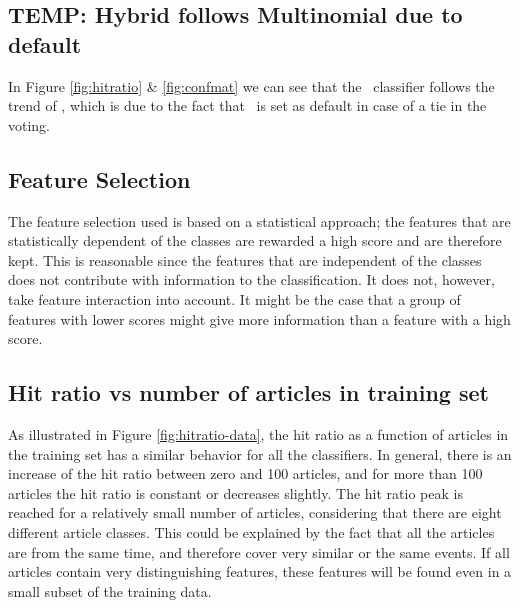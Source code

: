 \subsection{TEMP: Hybrid follows Multinomial due to default} %
\label{sub:temp_hybrid_follows_multinomial_due_to_default}
In Figure \ref{fig:hitratio} \& \ref{fig:confmat} we can see that the \hy\ classifier follows the trend of \mn, which is due to the fact that \mn\ is set as default in case of a tie in the voting.

\subsection{Feature Selection}
The feature selection used is based on a statistical approach; the features that are statistically dependent of the classes are rewarded a high score and are therefore kept. This is reasonable since the features that are independent of the classes does not contribute with information to the classification. It does not, however, take feature interaction into account. It might be the case that a group of features with lower scores might give more information than a feature with a high score. 

\subsection{Hit ratio vs number of articles in training set}
As illustrated in Figure \ref{fig:hitratio-data}, the hit ratio as a function of articles in the training set has a similar behavior for all the classifiers. In general, there is an increase of the hit ratio between zero and 100 articles, and for more than 100 articles the hit ratio is constant or decreases slightly. The hit ratio peak is reached for a relatively small number of articles, considering that there are eight different article classes. This could be explained by the fact that all the articles are from the same time, and therefore cover very similar or the same events. If all articles contain very distinguishing features, these features will be found even in a small subset of the training data.


